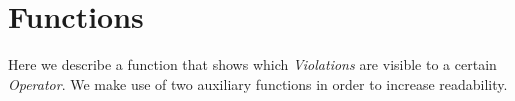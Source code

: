 \section{Functions}
Here we describe a function that shows which \emph{Violations} are visible to
a certain \emph{Operator}. We make use of two auxiliary functions in order to
increase readability.
